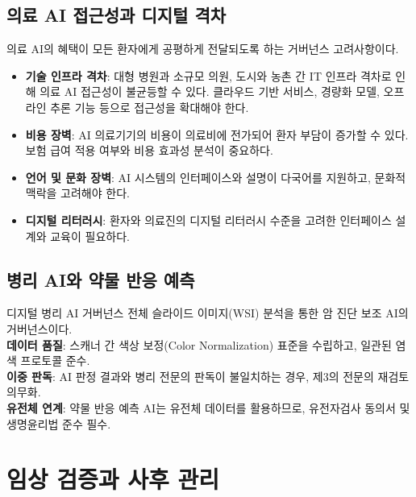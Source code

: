 \subsection{의료 AI 접근성과 디지털 격차}

의료 AI의 혜택이 모든 환자에게 공평하게 전달되도록 하는 거버넌스 고려사항이다.

\begin{itemize}
 \item \textbf{기술 인프라 격차}: 대형 병원과 소규모 의원, 도시와 농촌 간 IT 인프라 격차로 인해 의료 AI 접근성이 불균등할 수 있다. 클라우드 기반 서비스, 경량화 모델, 오프라인 추론 기능 등으로 접근성을 확대해야 한다.
 \item \textbf{비용 장벽}: AI 의료기기의 비용이 의료비에 전가되어 환자 부담이 증가할 수 있다. 보험 급여 적용 여부와 비용 효과성 분석이 중요하다.
 \item \textbf{언어 및 문화 장벽}: AI 시스템의 인터페이스와 설명이 다국어를 지원하고, 문화적 맥락을 고려해야 한다.
 \item \textbf{디지털 리터러시}: 환자와 의료진의 디지털 리터러시 수준을 고려한 인터페이스 설계와 교육이 필요하다.
\end{itemize}

\subsection{병리 AI와 약물 반응 예측}

\begin{practicaltool}{디지털 병리 AI 거버넌스}
전체 슬라이드 이미지(WSI) 분석을 통한 암 진단 보조 AI의 거버넌스이다.\\
\textbf{데이터 품질}: 스캐너 간 색상 보정(Color Normalization) 표준을 수립하고, 일관된 염색 프로토콜 준수.\\
\textbf{이중 판독}: AI 판정 결과와 병리 전문의 판독이 불일치하는 경우, 제3의 전문의 재검토 의무화.\\
\textbf{유전체 연계}: 약물 반응 예측 AI는 유전체 데이터를 활용하므로, 유전자검사 동의서 및 생명윤리법 준수 필수.
\end{practicaltool}

\section{임상 검증과 사후 관리}
\label{sec:16.6}

